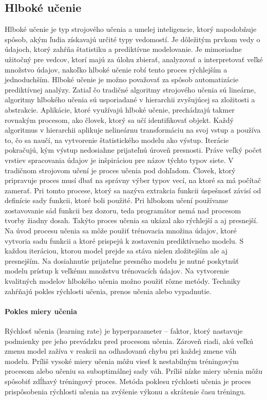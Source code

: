 \subsection{Hlboké učenie}
Hlboké učenie je typ strojového učenia a umelej inteligencie, ktorý napodobňuje spôsob, akým ľudia získavajú určité typy vedomostí. Je dôležitým prvkom vedy o údajoch, ktorý zahŕňa štatistiku a prediktívne modelovanie. Je mimoriadne užitočný pre vedcov, ktorí majú za úlohu zbierať, analyzovať a interpretovať veľké množstvo údajov, nakoľko hlboké učenie robí tento proces rýchlejším a jednoduchším.
Hlboké učenie je možno považovať za spôsob automatizácie prediktívnej analýzy. Zatiaľ čo tradičné algoritmy strojového učenia sú lineárne, algoritmy hlbokého učenia sú usporiadané v hierarchii zvyšujúcej sa zložitosti a abstrakcie.
Aplikácie, ktoré využívajú hlboké učenie, prechádzajú takmer rovnakým procesom, ako človek, ktorý sa učí identifikovať objekt. Každý algoritmus v hierarchii aplikuje nelineárnu transformáciu na svoj vstup a používa to, čo sa naučí, na vytvorenie štatistického modelu ako výstup. Iterácie pokračujú, kým výstup nedosiahne prijateľnú úroveň presnosti. Práve veľký počet vrstiev spracovania údajov je inšpiráciou pre názov týchto typov siete.
V tradičnom strojovom učení je proces učenia pod dohľadom. Človek, ktorý pripravuje proces musí dbať na správny výber typov vecí, na ktoré sa má počítač zamerať. Pri tomto procese, ktorý sa nazýva extrakcia funkcii úspešnosť závisí od definície sady funkcii, ktoré boli použité. Pri hlbokom učení používame zostavovanie sád funkcii bez dozoru, teda programátor nemá nad procesom tvorby žiadny dosah. Takýto proces učenia sa ukázal ako rýchlejší a aj presnejší.
Na úvod procesu učenia sa môže použiť trénovacia množina údajov, ktoré vytvoria sadu funkcii a ktoré prispejú k zostaveniu prediktívneho modelu. S každou iteráciou, ktorou model prejde sa stáva nielen zložitejším ale aj presnejším. Na dosiahnutie prijateľne presného modelu je nutné poskytnúť modelu prístup k veľkému množstvu trénovacích údajov.
Na vytvorenie kvalitných modelov hlbokého učenia možno použiť rôzne metódy. Techniky zahŕňajú pokles rýchlosti učenia, prenos učenia alebo vypadnutie.
\paragraph{Pokles miery učenia} Rýchlosť učenia (learning rate) je hyperparameter – faktor, ktorý nastavuje podmienky pre jeho prevádzku pred procesom učenia. Zároveň riadi, akú veľkú zmenu model zažíva v reakcii na odhadovanú chybu pri každej zmene váh modelu. Príliš vysoké miery učenia môžu viesť k nestabilným tréningovým procesom alebo učeniu sa suboptimálnej sady váh. Príliš nízke miery učenia môžu spôsobiť zdĺhavý tréningový proces. Metóda poklesu rýchlosti učenia je proces prispôsobenia rýchlosti učenia na zvýšenie výkonu a skrátenie času tréningu.
